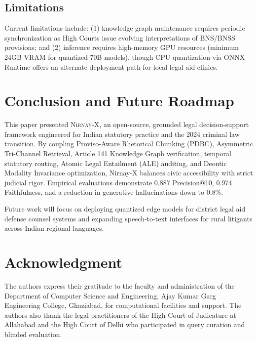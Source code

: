\documentclass[conference]{IEEEtran}
\begin{document}
\subsection{Limitations}
Current limitations include: (1) knowledge graph maintenance requires periodic synchronization as High Courts issue evolving interpretations of BNS/BNSS provisions; and (2) inference requires high-memory GPU resources (minimum 24GB VRAM for quantized 70B models), though CPU quantization via ONNX Runtime offers an alternate deployment path for local legal aid clinics.

\section{Conclusion and Future Roadmap}
This paper presented \textsc{Nirnay-X}, an open-source, grounded legal decision-support framework engineered for Indian statutory practice and the 2024 criminal law transition. By coupling Proviso-Aware Rhetorical Chunking (PDBC), Asymmetric Tri-Channel Retrieval, Article 141 Knowledge Graph verification, temporal statutory routing, Atomic Legal Entailment (ALE) auditing, and Deontic Modality Invariance optimization, Nirnay-X balances civic accessibility with strict judicial rigor. Empirical evaluations demonstrate 0.887 Precision@10, 0.974 Faithfulness, and a reduction in generative hallucinations down to 0.8\%.

Future work will focus on deploying quantized edge models for district legal aid defense counsel systems and expanding speech-to-text interfaces for rural litigants across Indian regional languages.

\section*{Acknowledgment}
The authors express their gratitude to the faculty and administration of the Department of Computer Science and Engineering, Ajay Kumar Garg Engineering College, Ghaziabad, for computational facilities and support. The authors also thank the legal practitioners of the High Court of Judicature at Allahabad and the High Court of Delhi who participated in query curation and blinded evaluation.
\end{document}
